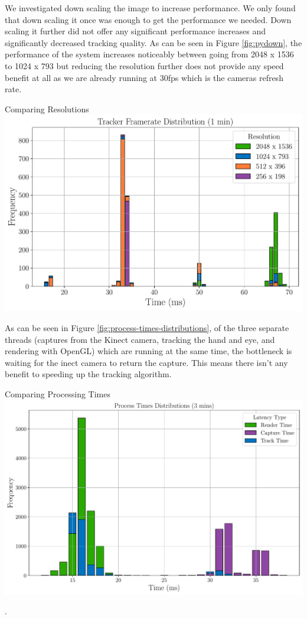 We investigated down scaling the image to increase performance. We only found that down scaling it once was enough to get the performance we needed. Down scaling it further did not offer any significant performance increases and significantly decreased tracking quality. As can be seen in Figure \ref{fig:pydown}, the performance of the system increases noticeably between going from 2048 x 1536 to 1024 x 793 but reducing the resolution further does not provide any speed benefit at all as we are already running at 30fps which is the cameras refresh rate.

\begin{figureBox}[label={fig:pydown}, width=1.0\linewidth]{Comparing Resolutions}
	\includegraphics[width = 1.0\linewidth]{./evaluation/figures/pydown.pdf}
\end{figureBox}

As can be seen in Figure \ref{fig:process-times-distributions}, of the three separate threads (captures from the Kinect camera, tracking the hand and eye, and rendering with OpenGL) which are running at the same time, the bottleneck is waiting for the inect camera to return the capture. This means there isn't any benefit to speeding up the tracking algorithm.

\begin{figureBox}[label={fig:process-times-distributions}, width=1.0\linewidth]{Comparing Processing Times}
	\includegraphics[width = 1.0\linewidth]{./evaluation/figures/process-times-distributions.pdf}
\end{figureBox}.


